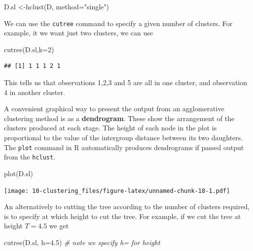 \documentclass[
]{book}
\newenvironment{Shaded}{\begin{snugshade}}{\end{snugshade}}
\newcommand{\AttributeTok}[1]{\textcolor[rgb]{0.77,0.63,0.00}{#1}}
\newcommand{\CommentTok}[1]{\textcolor[rgb]{0.56,0.35,0.01}{\textit{#1}}}
\newcommand{\DecValTok}[1]{\textcolor[rgb]{0.00,0.00,0.81}{#1}}
\newcommand{\FloatTok}[1]{\textcolor[rgb]{0.00,0.00,0.81}{#1}}
\newcommand{\FunctionTok}[1]{\textcolor[rgb]{0.00,0.00,0.00}{#1}}
\newcommand{\NormalTok}[1]{#1}
\newcommand{\OtherTok}[1]{\textcolor[rgb]{0.56,0.35,0.01}{#1}}
\newcommand{\StringTok}[1]{\textcolor[rgb]{0.31,0.60,0.02}{#1}}
\theoremstyle{definition}
\theoremstyle{definition}
\theoremstyle{definition}
\theoremstyle{definition}
\theoremstyle{remark}
\begin{document}
\begin{Shaded}
\begin{Highlighting}[]
\NormalTok{D.sl }\OtherTok{\textless{}{-}}\FunctionTok{hclust}\NormalTok{(D, }\AttributeTok{method=}\StringTok{"single"}\NormalTok{)}
\end{Highlighting}
\end{Shaded}

We can use the \texttt{cutree} command to specify a given number of clusters. For example, it we want just two clusters, we can use

\begin{Shaded}
\begin{Highlighting}[]
\FunctionTok{cutree}\NormalTok{(D.sl,}\AttributeTok{k=}\DecValTok{2}\NormalTok{)}
\end{Highlighting}
\end{Shaded}

\begin{verbatim}
## [1] 1 1 1 2 1
\end{verbatim}

This tells us that observations 1,2,3 and 5 are all in one cluster, and observation 4 in another cluster.

A convenient graphical way to present the output from an agglomerative clustering method is as a \textbf{dendrogram}. These show the arrangement of the clusters produced at each stage. The height of each node in the plot is proportional to the value of the intergroup distance between its two daughters. The \texttt{plot} command in R automatically produces dendrograms if passed output from the \texttt{hclust}.

\begin{Shaded}
\begin{Highlighting}[]
\FunctionTok{plot}\NormalTok{(D.sl)}
\end{Highlighting}
\end{Shaded}

\texttt{[image: 10-clustering\_files/figure-latex/unnamed-chunk-18-1.pdf]}

An alternatively to cutting the tree according to the number of clusters required, is to specify at which height to cut the tree. For example, if we cut the tree at height \(T=4.5\) we get

\begin{Shaded}
\begin{Highlighting}[]
\FunctionTok{cutree}\NormalTok{(D.sl, }\AttributeTok{h=}\FloatTok{4.5}\NormalTok{) }\CommentTok{\# note we specify h= for height}
\end{Highlighting}
\end{Shaded}
\end{document}
